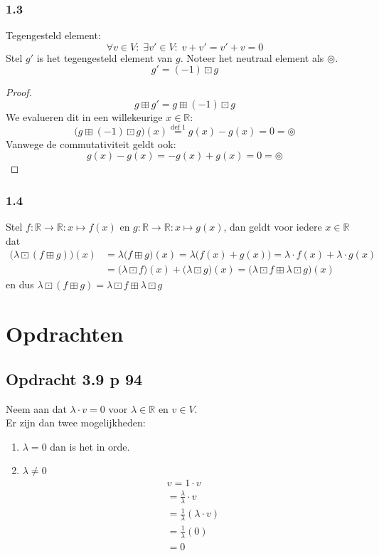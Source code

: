 \documentclass[lineaire_algebra_oplossingen.tex]{subfiles}
\begin{document}
\subsubsection*{1.3}
Tegengesteld element:
\[
\forall v \in V:\;\exists v' \in V:\; v+v'=v'+v=0
\]
Stel $g'$ is het tegengesteld element van $g$.
Noteer het neutraal element als $\circledcirc$.
\[
g' = (-1) \boxdot g
\]
\begin{proof}
\[
g \boxplus g' = g \boxplus (-1) \boxdot g
\]
We evalueren dit in een willekeurige $x \in \mathbb{R}$:
\[ 
\big( g\boxplus (-1) \boxdot g \big)(x) \overset{\text{def 1}}{=} g(x) -g(x) = 0 = \circledcirc
\]
Vanwege de commutativiteit geldt ook:
\[
g(x) -g(x) = -g(x) + g(x) = 0 = \circledcirc
\]
\end{proof}
\subsubsection{1.4}
Stel $f:\mathbb{R} \rightarrow \mathbb{R}: x \mapsto f(x)$ en $g:\mathbb{R} \rightarrow \mathbb{R}: x \mapsto g(x)$, dan geldt voor iedere $x \in \mathbb{R}$ dat
\begin{align*}
\big( \lambda \boxdot (f \boxplus g) \big)(x) 
    &= \lambda \big( f \boxplus g \big)(x) 
     = \lambda \big( f(x) + g(x) \big)
     = \lambda \cdot f(x) + \lambda \cdot g(x) \\
    &= \big( \lambda \boxdot f \big)(x) + \big( \lambda \boxdot g \big)(x)
     = \big( \lambda \boxdot f \boxplus \lambda \boxdot g \big)(x)
\end{align*}
en dus $\lambda \boxdot (f \boxplus g) = \lambda \boxdot f \boxplus \lambda \boxdot g $


\section{Opdrachten}

\subsection{Opdracht 3.9 p 94}
\label{3.9}
Neem aan dat $\lambda \cdot v = 0$ voor $\lambda \in \mathbb{R}$ en $v \in V$.\\
Er zijn dan twee mogelijkheden:\\
\begin{enumerate}
\item $\lambda = 0$ dan is het in orde.
\item $\lambda \neq 0$
\begin{align*}
v = 1\cdot v \tag{co\"effici\"ent}
\\
= \frac{\lambda}{\lambda}\cdot v
\\
= \frac{1}{\lambda}(\lambda \cdot v) \tag{gemegde associativiteit}
\\
= \frac{1}{\lambda}(0) \tag{lemma 3.8.1}
\\
= 0
\end{align*}
\end{enumerate}
\end{document}
